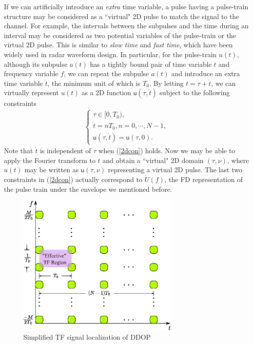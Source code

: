 \documentclass[journal]{IEEEtran}
\begin{document}
If we can artificially introduce an \emph{extra} time variable, a pulse having a pulse-train structure may be considered as a ``virtual" 2D pulse to match the signal to the channel.
  For example, the intervals between the subpulses and the time during an interval may be considered as two potential variables of the pulse-train or the virtual 2D pulse. This is similar to \emph{slow time} and \emph{fast time}, which have been widely used in radar waveform design\cite{radar_handbook,radar_sp}.
In particular, for the pulse-train $u(t)$, although its subpulse $a(t)$ has a tightly bound pair of time variable $t$ and frequency variable $f$, we can repeat the subpulse $a(t)$ and introduce an extra time variable $\dot t$, {the minimum unit of which} is $T_0$. %
By letting $t=\tau+\dot t$, we can virtually represent $u(t)$ as a 2D function $\mathsf u(\tau, \dot t)$ subject to the following constraints
\begin{align}\label{2dcon}
  \begin{cases}
    \tau \in [0,T_0),                  \\
    \dot t= n T_0, n = 0, \cdots, N-1, \\
    \mathsf u(\tau, \dot t)=\mathsf u(\tau, 0).
  \end{cases}
\end{align}
Note that $\dot t$ is independent of $\tau$ when  (\ref{2dcon}) holds.
Now we may be able to apply the Fourier transform to $\dot t$ and obtain a ``virtual" 2D domain $(\tau, \nu)$, where $u(t)$ may be written as $\mathsf u(\tau, \nu)$ representing a virtual 2D pulse.
The last two constraints in (\ref{2dcon}) actually correspond to $\dot U(f)$, the FD representation of the pulse train under the envelope we mentioned before.

\begin{figure}
  \centering
  \includegraphics[width=8cm]{ddop_tfl}
  \caption{Simplified TF signal localization of DDOP}
  \label{tfl_ddop}
\end{figure}
\end{document}
